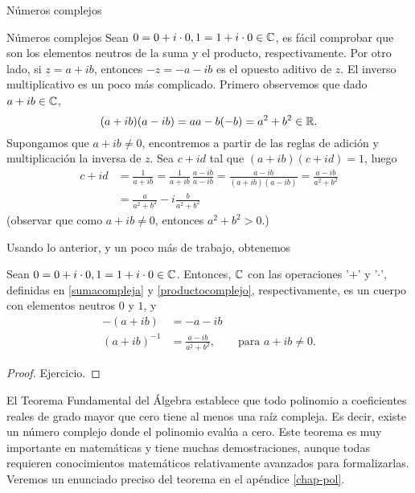 \begin{chapter}{N\'umeros complejos}
\begin{section}{N\'umeros complejos}
    Sean $0 = 0 + i\cdot 0, 1 = 1 + i\cdot 0 \in \mathbb C$,  es fácil comprobar que son los elementos neutros de la suma y el producto,  respectivamente. Por otro lado, si $z = a + ib$,  entonces $-z = -a -ib$ es el opuesto aditivo de $z$.
    El inverso multiplicativo es un poco más complicado. Primero observemos que dado $a+ib \in \mathbb C$,
    \begin{equation*}
        (a+ ib)(a-ib) = aa -b(-b) = a^2 + b^2 \in \mathbb R.
    \end{equation*}
    Supongamos que $a+ib\ne0$,  encontremos  a partir  de las reglas de adición y multiplicación la inversa de $z$. Sea $c+id$ tal que $(a+ib)(c+id)=1$, luego
    \begin{align*}
        c + id & = \frac{1}{a+ib} = \frac{1}{a+ib}\,\frac{a-ib}{a-ib} = \frac{a-ib}{(a+ib)(a-ib)} =
        \frac{a-ib}{ a^2 + b^2}                                                                     \\
            & = \frac{a}{ a^2 + b^2} - i\frac{b}{ a^2 + b^2}
    \end{align*}
    (observar que como $a+ib\ne0$,  entonces $a^2 + b^2 >0$.)

    Usando lo anterior,  y un poco más de trabajo, obtenemos

    \begin{proposicion}
        Sean $0 = 0 + i\cdot 0, 1 = 1 + i\cdot 0\in \mathbb C$. Entonces, $\mathbb C$ con las operaciones '$+$' y '$\cdot$', definidas en \eqref{sumacompleja} y
        \eqref{productocomplejo},  respectivamente, es un cuerpo con elementos neutros $0$ y $1$, y
        \begin{align*}
            -(a+ib)     & = -a -ib                                                    \\
            (a+ib)^{-1} & = 	\frac{a-ib}{ a^2 + b^2}, \qquad \text{para $a+ib \ne 0$}.
        \end{align*}
    \end{proposicion}
    \begin{proof}
        Ejercicio.
    \end{proof}


    \begin{observacion}
        El Teorema Fundamental del Álgebra establece que todo polinomio a coeficientes reales de grado mayor que cero tiene al menos una raíz compleja. Es decir, existe un número complejo donde el polinomio evalúa a cero. Este teorema es muy importante en matemáticas y tiene muchas demostraciones, aunque todas requieren conocimientos matemáticos relativamente avanzados para formalizarlas. Veremos un enunciado preciso del teorema en el apéndice \ref{chap-pol}.
    \end{observacion}


\end{section}
\end{chapter}
